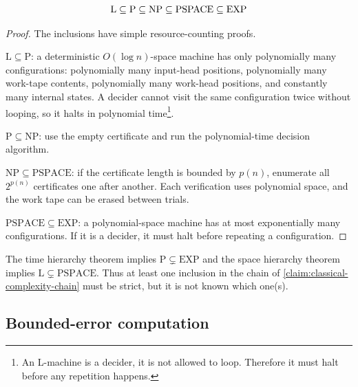 \begin{claim}\label{claim:classical-complexity-chain}
\leavevmode\setlength{\abovedisplayskip}{0pt}\vspace{-\baselineskip}
\[
\mathrm{L}
\subseteq
\mathrm{P}
\subseteq
\mathrm{NP}
\subseteq
\mathrm{PSPACE}
\subseteq
\mathrm{EXP}
\qedhere
\]
\end{claim}


\begin{proof}
The inclusions have simple resource-counting proofs.

\(\mathrm{L}\subseteq\mathrm{P}\):
a deterministic \(O(\log n)\)-space machine has only polynomially many configurations:
polynomially many input-head positions, polynomially many work-tape contents, polynomially many work-head positions, and constantly many internal states.
A decider cannot visit the same configuration twice without looping, so it halts in polynomial time\footnote{%
An L-machine is a decider, it is not allowed to loop. 
Therefore it must halt before any repetition happens.%
}.

\(\mathrm{P}\subseteq\mathrm{NP}\):
use the empty certificate and run the polynomial-time decision algorithm.

\(\mathrm{NP}\subseteq\mathrm{PSPACE}\):
if the certificate length is bounded by \(p(n)\), enumerate all \(2^{p(n)}\) certificates one after another.
Each verification uses polynomial space, and the work tape can be erased between trials.

\(\mathrm{PSPACE}\subseteq\mathrm{EXP}\):
a polynomial-space machine has at most exponentially many configurations.
If it is a decider, it must halt before repeating a configuration.
\end{proof}

The time hierarchy theorem implies
\(
\mathrm{P}
\subsetneq
\mathrm{EXP}
\)
and the space hierarchy theorem implies
\(
\mathrm{L}
\subsetneq
\mathrm{PSPACE}
\).
Thus at least one inclusion in the chain of \autoref{claim:classical-complexity-chain} must be strict,
but it is not known which one(s).

\subsection{Bounded-error computation}\label{sec:bounded-error-computation}

